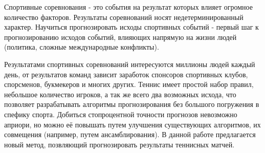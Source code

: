 \Introduction



Спортивные соревнования - это события на результат которых влияет огромное количество факторов. Результаты соревнований носят недетерминированный характер. Научиться прогнозировать исходы спортивных событий - первый шаг к прогнозированию исходов событий, влияющих напрямую на жизни людей (политика, сложные международные конфликты).

Результатами спортивных соревнований интересуются миллионы людей каждый день, от результатов команд зависит заработок спонсоров спортивных клубов, спорсменов, букмекеров и многих других.  Теннис имеет простой набор правил, небольшое количество игроков,  а так же всего два возможных исхода, что позволяет разрабатывать алгоритмы прогнозирования без большого погружения в спефику спорта.
Добиться стопроцентной точности прогнозов невозможно априори, но можно её повышать путем улучшения существующих алгоритмов, их совмещения (например, путем ансамблирования). 
В данной работе предлагается новый метод, позвляющий прогнозировать результаты теннисных матчей.
                                                                                                                                                                                                                                                                                                                    

